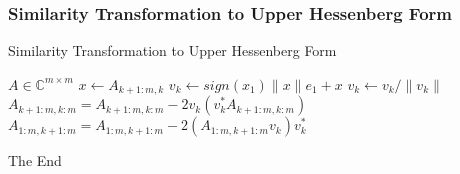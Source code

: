 \documentclass{beamer}
\begin{document}
\begin{frame}
    \frametitle{Similarity Transformation to Upper Hessenberg Form}
    \begin{algorithm}[H]
        \caption{Similarity Transformation to Upper Hessenberg Form}\label{alg:cap}
        \begin{algorithmic}
        \Require \(A \in \mathbb{C}^{m \times m}\)
            \State \( x \gets A_{k+1: m, k}\) 
            \State \(v_k \gets sign(x_1) \|x\|e_1+ x\) 
            \State \(v_k \gets v_k / \|v_k\|\)
            \State \(A_{k+1:m, k:m} = A_{k+1:m, k:m} - 2 v_k(v_k^{*}A_{k+1:m, k:m})\)
            \State \(A_{1:m, k+1:m} = A_{1:m, k+1:m} - 2(A_{1:m, k+1:m}v_k)v_k^{*}\) 
        \EndFor
        \end{algorithmic}
    \end{algorithm}
\end{frame}

\begin{frame}
\Huge{\centerline{The End}}
\end{frame}

\end{document}
